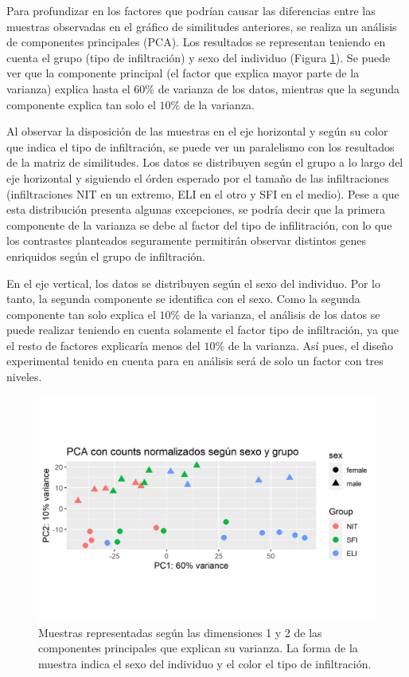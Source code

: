 \documentclass[
]{article}
\begin{document}
Para profundizar en los factores que podrían causar las diferencias
entre las muestras observadas en el gráfico de similitudes anteriores,
se realiza un análisis de componentes principales (PCA). Los resultados
se representan teniendo en cuenta el grupo (tipo de infiltración) y sexo
del individuo (Figura \ref{fig:Fig5}). Se puede ver que la componente
principal (el factor que explica mayor parte de la varianza) explica
hasta el \(60\%\) de varianza de los datos, mientras que la segunda
componente explica tan solo el \(10\%\) de la varianza.

Al observar la disposición de las muestras en el eje horizontal y según
su color que indica el tipo de infiltración, se puede ver un paralelismo
con los resultados de la matriz de similitudes. Los datos se distribuyen
según el grupo a lo largo del eje horizontal y siguiendo el órden
esperado por el tamaño de las infiltraciones (infiltraciones NIT en un
extremo, ELI en el otro y SFI en el medio). Pese a que esta distribución
presenta algunas excepciones, se podría decir que la primera componente
de la varianza se debe al factor del tipo de infilitración, con lo que
los contrastes planteados seguramente permitirán observar distintos
genes enriquidos según el grupo de infiltración.

En el eje vertical, los datos se distribuyen según el sexo del
individuo. Por lo tanto, la segunda componente se identifica con el
sexo. Como la segunda componente tan solo explica el \(10\%\) de la
varianza, el análisis de los datos se puede realizar teniendo en cuenta
solamente el factor tipo de infiltración, ya que el resto de factores
explicaría menos del \(10\%\) de la varianza. Así pues, el diseño
experimental tenido en cuenta para en análisis será de solo un factor
con tres niveles.

\begin{figure}

{\centering \includegraphics[width=0.8\linewidth]{results/2.AnaDescript/3.PCA} 

}

\caption{Muestras representadas según las dimensiones 1 y 2 de las componentes principales que explican su varianza. La forma de la muestra indica el sexo del individuo y el color el tipo de infiltración.}\label{fig:Fig5}
\end{figure}
\end{document}
